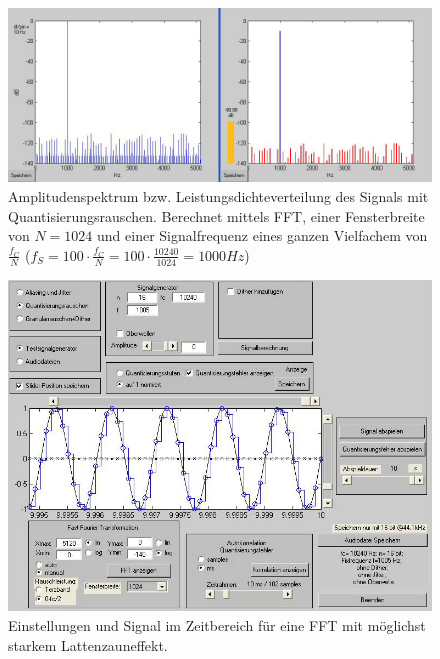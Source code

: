\begin{figure}[h!]
\centering
\includegraphics[width=\columnwidth]{figures/Aufg1/2_2_fenster_ok.JPG} 
\caption{Amplitudenspektrum bzw. Leistungsdichteverteilung des Signals mit Quantisierungsrauschen. Berechnet mittels FFT, einer Fensterbreite von $N = 1024$ und einer Signalfrequenz eines ganzen Vielfachem von $\frac{f_C}{N}$ ($f_S = 100 \cdot \frac{f_C}{N} = 100 \cdot \frac{10240}{1024} = 1000Hz$)}
\end{figure}

\begin{figure}[h!]
\centering
\includegraphics[width=\columnwidth]{figures/Aufg1/2_2_fenster_schlecht_einstell.JPG} 
\caption{Einstellungen und Signal im Zeitbereich für eine FFT mit möglichst starkem Lattenzauneffekt.}
\end{figure}


